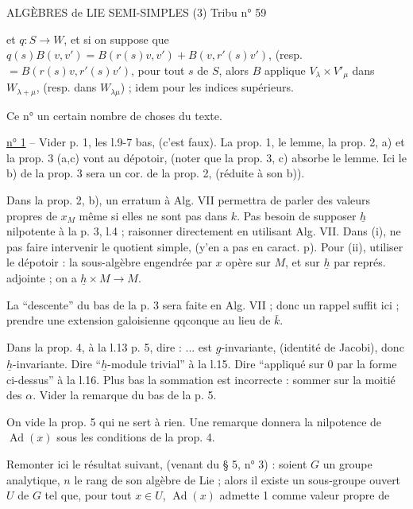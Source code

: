 
ALGÈBRES de LIE SEMI-SIMPLES (3) \hfill Tribu n° 59

et $q:S\longrightarrow W$, et si on suppose que $q(s)B(v,v')=B(r(s)v,v')+B(v,r'(s)v')$, (resp. $=B(r(s)v,r'(s)v')$, pour tout $s$ de $S$, alors $B$ applique $V_\lambda\times V'_\mu$ dans $W_{\lambda+\mu}$, (resp. dans $W_{\lambda\mu}$) ; idem pour les indices supérieurs.

Ce n°  un certain nombre de choses du texte.

\uline{n° 1} -- Vider p. 1, les l.9-7 bas, (c'est faux). La prop. 1, le lemme, la prop. 2, a) et la prop. 3 (a,c) vont au dépotoir, (noter que la prop. 3, c) absorbe le lemme. Ici le b) de la prop. 3 sera un cor. de la prop. 2, (réduite à son b)).

Dans la prop. 2, b), un erratum à Alg. VII permettra de parler des valeurs propres de $x_M$ même si elles ne sont pas dans $k$. Pas besoin de supposer $\underline{h}$ nilpotente à la p. 3, l.4 ; raisonner directement en utilisant Alg. VII. Dans (i), ne pas faire intervenir le quotient simple, (y'en a pas en caract. p). Pour (ii), utiliser le dépotoir : la sous-algèbre engendrée par $x$ opère sur $M$, et sur $\underline{h}$ par représ. adjointe ; on a $\underline{h}\times M\longrightarrow M$.

La ``descente'' du bas de la p. 3 sera faite en Alg. VII ; donc un rappel suffit ici ; prendre une extension galoisienne qqconque au lieu de $\bar k$.

Dans la prop. 4, à la l.13 p. 5, dire : ... est $\underline{g}$-invariante, (identité de Jacobi), donc $\underline{h}$-invariante. Dire ``$\underline{h}$-module trivial'' à la l.15. Dire ``appliqué sur 0 par la forme ci-dessus'' à la l.16. Plus bas la sommation est incorrecte : sommer sur la moitié des $\alpha$. Vider la remarque du bas de la p. 5.

On vide la prop. 5 qui ne sert à rien. Une remarque donnera la nilpotence de $\operatorname{Ad}(x)$ sous les conditions de la prop. 4.

Remonter ici le résultat suivant, (venant du § 5, n° 3) : soient $G$ un groupe analytique, $n$ le rang de son algèbre de Lie ; alors il existe un sous-groupe ouvert $U$ de $G$ tel que, pour tout $x\in U$, $\operatorname{Ad}(x)$ admette 1 comme valeur propre de
